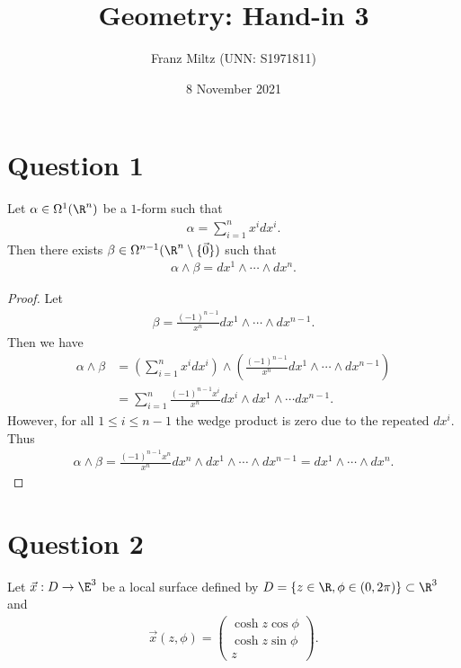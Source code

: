 \documentclass{article}
\begin{document}
\title{Geometry: Hand-in 3}
\author{Franz Miltz (UNN: S1971811)}
\date{8 November 2021}
\maketitle

\section*{Question 1}

\begin{claim*}
   Let $\alpha\in\Omega^1(\R^n)$ be a $1$-form such that 
   \begin{align*}
      \alpha=\sum_{i=1}^n x^idx^i.
   \end{align*}
   Then there exists $\beta\in\Omega^{n-1}(\R^n\setminus\{\vec 0\})$ such that 
   \begin{align*}
      \alpha\wedge\beta = dx^1\wedge\cdots\wedge dx^n.
   \end{align*}
\end{claim*}
\begin{proof}
   Let 
   \begin{align*}
      \beta = \frac{(-1)^{n-1}}{x^n}dx^1\wedge\cdots\wedge dx^{n-1}.
   \end{align*}
   Then we have 
   \begin{align*}
      \alpha\wedge\beta &= \left(\sum_{i=1}^n x^idx^i\right) \wedge \left(\frac{(-1)^{n-1}}{x^n}dx^1\wedge\cdots\wedge dx^{n-1}\right)\\
                        &= \sum_{i=1}^n \frac{(-1)^{n-1}x^i}{x^n}dx^i\wedge dx^1 \wedge \cdots dx^{n-1}.
   \end{align*}
   However, for all $1\leq i\leq n-1$ the wedge product is zero due to the repeated $dx^i$. Thus 
   \begin{align*}
      \alpha\wedge\beta = \frac{(-1)^{n-1}x^n}{x^n}dx^n\wedge dx^1\wedge\cdots\wedge dx^{n-1}=dx^1\wedge\cdots\wedge dx^n.
   \end{align*}
\end{proof}

\section*{Question 2}

Let $\vec x: D\to\E^3$ be a local surface defined by $D=\{z\in\R,\phi\in(0,2\pi)\}\subset\R^3$ and 
\begin{align*}
   \vec x(z,\phi)=\begin{pmatrix}
      \cosh z \cos\phi \\ \cosh z \sin\phi \\ z
   \end{pmatrix}.
\end{align*}
\end{document}
